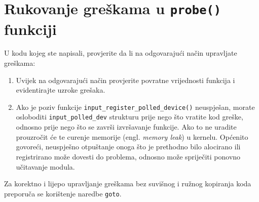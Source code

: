 \documentclass[11pt]{article}
\begin{document}
\section{Rukovanje greškama u \texttt{probe()} funkciji}
U kodu kojeg ste napisali, provjerite da li na odgovarajući način upravljate
greškama:
\begin{enumerate}
	\item Uvijek na odgovarajući način provjerite povratne vrijednosti
		funkcija i evidentirajte uzroke grešaka.
	\item Ako je poziv funkcije \texttt{input\_register\_polled\_device()}
		neuspješan, morate osloboditi \texttt{input\_polled\_dev} strukturu
		prije nego što vratite kod greške, odnosno prije nego što se završi
		izvršavanje funkcije. Ako to ne uradite prouzročit će te curenje
		memorije (engl. \textit{memory leak}) u kernelu. Općenito govoreći,
		neuspješno otpuštanje onoga što je prethodno bilo alocirano ili
		registrirano može dovesti do problema, odnosno može spriječiti ponovno
		učitavanje modula.
\end{enumerate}

Za korektno i lijepo upravljanje greškama bez suvišnog i ružnog kopiranja koda
preporuča se korištenje naredbe \texttt{goto}.
\end{document}
